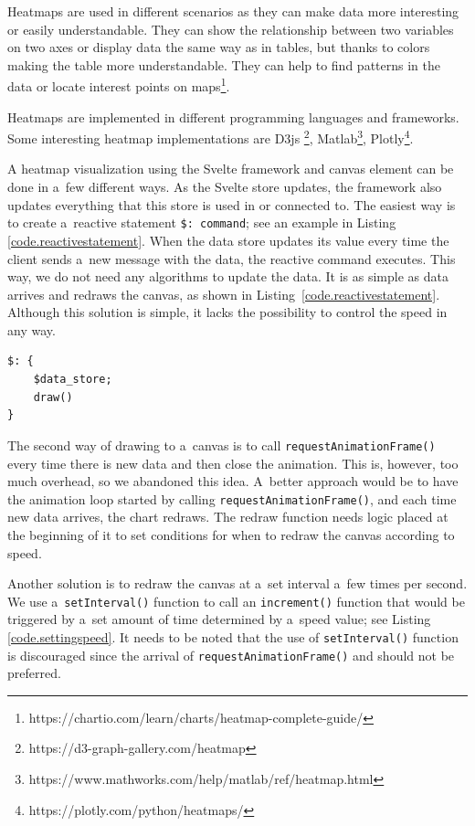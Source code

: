 Heatmaps are used in different scenarios as they can make data more interesting or easily understandable. They can show the relationship between two variables on two axes or display data the same way as in tables, but thanks to colors making the table more understandable. They can help to find patterns in the data or locate interest points on maps\footnote{https://chartio.com/learn/charts/heatmap-complete-guide/}.

Heatmaps are implemented in different programming languages and frameworks. Some interesting heatmap implementations are D3js \footnote{https://d3-graph-gallery.com/heatmap}, Matlab\footnote{https://www.mathworks.com/help/matlab/ref/heatmap.html}, Plotly\footnote{https://plotly.com/python/heatmaps/}.

A heatmap visualization using the Svelte framework and canvas element can be done in a~few different ways. As the Svelte store updates, the framework also updates everything that this store is used in or connected to. The easiest way is to create a~reactive statement \texttt{\$: command}; see an example in Listing \ref{code.reactivestatement}. When the data store updates its value every time the client sends a~new message with the data, the reactive command executes. This way, we do not need any algorithms to update the data. It is as simple as data arrives and redraws the canvas, as shown in Listing~\ref{code.reactivestatement}. Although this solution is simple, it lacks the possibility to control the speed in any way.

\begin{lstlisting}[caption={Svelte reactive statement for redrawing canvas element.},label=code.reactivestatement]
$: {
    $data_store;
    draw()
}    
\end{lstlisting}

The second way of drawing to a~canvas is to call \texttt{requestAnimationFrame()} every time there is new data and then close the animation. This is, however, too much overhead, so we abandoned this idea. A~better approach would be to have the animation loop started by calling \texttt{requestAnimationFrame()}, and each time new data arrives, the chart redraws. The redraw function needs logic placed at the beginning of it to set conditions for when to redraw the canvas according to speed.

Another solution is to redraw the canvas at a~set interval a~few times per second. We use a~\texttt{setInterval()} function to call an \texttt{increment()} function that would be triggered by a~set amount of time determined by a~speed value; see Listing \ref{code.settingspeed}. It needs to be noted that the use of \texttt{setInterval()} function is discouraged since the arrival of \texttt{requestAnimationFrame()} and should not be preferred.


